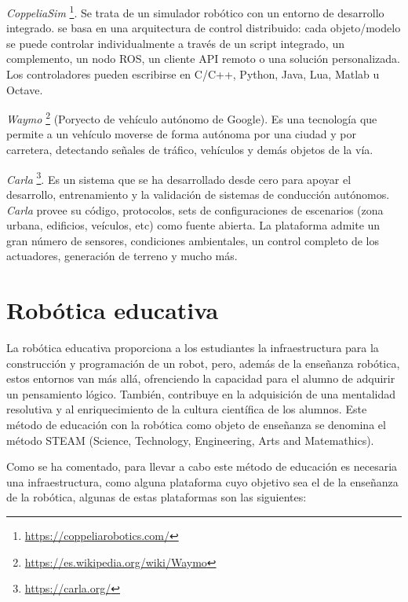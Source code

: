 \documentclass[a4paper, 12pt]{book}
\begin{document}
\emph{CoppeliaSim} \footnote{\url{https://coppeliarobotics.com/}}. Se trata de un simulador robótico con un entorno de desarrollo integrado. se basa en una arquitectura de control distribuido: cada objeto/modelo se puede controlar individualmente a través de un script integrado, un complemento, un nodo ROS, un cliente API remoto o una solución personalizada. Los controladores pueden escribirse en  C/C++, Python, Java, Lua, Matlab u Octave.

\emph{Waymo} \footnote{\url{https://es.wikipedia.org/wiki/Waymo}} (Poryecto de vehículo autónomo de Google). Es una tecnología que permite a un vehículo moverse de forma autónoma por una ciudad y por carretera, detectando señales de tráfico, vehículos y demás objetos de la vía.

\emph{Carla} \footnote{\url{https://carla.org/}}. Es un sistema que se ha desarrollado desde cero para apoyar el desarrollo, entrenamiento y la validación de sistemas de conducción autónomos. \emph{Carla} provee su código, protocolos, sets de configuraciones de escenarios (zona urbana, edificios, veículos, etc) como fuente abierta. La plataforma admite un gran número de sensores, condiciones ambientales, un control completo de los actuadores, generación de terreno y mucho más.

\section{Robótica educativa}
\label{sec:robotica educativa}

La robótica educativa proporciona a los estudiantes la infraestructura para la construcción y programación de un robot, pero, además de la enseñanza robótica,
estos entornos van más allá, ofrenciendo la capacidad para el alumno de adquirir un pensamiento lógico. También, contribuye en la adquisición de una mentalidad resolutiva y al enriquecimiento de la cultura científica de los alumnos. Este método de educación con la robótica como objeto de enseñanza se denomina el método STEAM (Science, Technology, Engineering, Arts and Matemathics).

Como se ha comentado, para llevar a cabo este método de educación es necesaria una infraestructura, como alguna plataforma cuyo objetivo sea el de la enseñanza de la robótica, algunas de estas plataformas son las siguientes:
\end{document}
